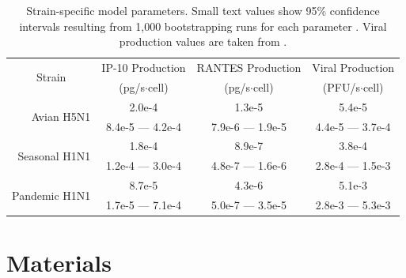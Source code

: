 \documentclass[10pt]{article}
\begin{document}
\begin{table}
\begin{center}
\label{table:parameters}
\end{center}
\end{table}


\begin{table}
\centering
\begin{tabular}{ | r | c | c | c | }
  \hline                        
  \multicolumn{1}{|c|}{\multirow{2}{*}{Strain}} & IP-10 Production & RANTES Production & Viral Production \\
   & \footnotesize{(pg/s$\cdot$cell)}  & \footnotesize{(pg/s$\cdot$cell)} &  \footnotesize{(PFU/s$\cdot$cell)} \\
  \hline
  \multirow{2}{*}{Avian H5N1} & 2.0e-4 &  1.3e-5 & 5.4e-5 \\
   &  \footnotesize{8.4e-5 --- 4.2e-4} & \footnotesize{7.9e-6 --- 1.9e-5} & \footnotesize{4.4e-5 --- 3.7e-4}\\ 
   \hline
  \multirow{2}{*}{Seasonal H1N1} & 1.8e-4 &  8.9e-7 & 3.8e-4 \\
   & \footnotesize{1.2e-4 --- 3.0e-4} & \footnotesize{4.8e-7 --- 1.6e-6} & \footnotesize{2.8e-4 --- 1.5e-3}\\
   \hline
  \multirow{2}{*}{Pandemic H1N1} & 8.7e-5 &  4.3e-6 & 5.1e-3 \\
   & \footnotesize{1.7e-5 --- 7.1e-4} & \footnotesize{5.0e-7 --- 3.5e-5} & \footnotesize{2.8e-3 --- 5.3e-3} \\
  \hline
\end{tabular}
\caption{Strain-specific model parameters.  Small text values show 95\% confidence intervals resulting from 1,000 bootstrapping runs for each parameter \cite{Wu1986}.  Viral production values are taken from \cite{Mitchell2011}.}
\label{table:strains}
\end{table}

\section*{Materials}
\end{document}
